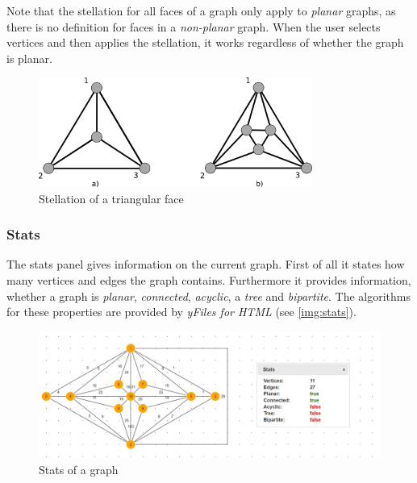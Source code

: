 {\begin{tabular}{p{}p{}}
\end{tabular}
Note that the stellation for all faces of a graph only apply to \textit{planar} graphs, as there is no definition for faces in a \textit{non-planar} graph. When the user selects vertices and then applies the stellation, it works regardless of whether the graph is planar.
\begin{figure}
\begin{center}
\includegraphics[width=0.8\textwidth]{figures/figIndex/stellation.png}
\caption{Stellation of a triangular face}
\label{img:stell}
\end{center}
\end{figure}
\subsubsection{Stats}
The stats panel gives information on the current graph. First of all it states how many vertices and edges the graph contains. Furthermore it provides information, whether a graph is \textit{planar}, \textit{connected}, \textit{acyclic}, a  \textit{tree} and \textit{bipartite}. The algorithms for these properties are provided by \textit{yFiles for HTML} (see \autoref{img:stats}).
\begin{figure}[!h]
\begin{center}
\includegraphics[width=1\textwidth]{figures/figIndex/StatsPanels.jpg}
\caption{Stats of a graph}
\label{img:stats}
\end{center}
\end{figure}
}
